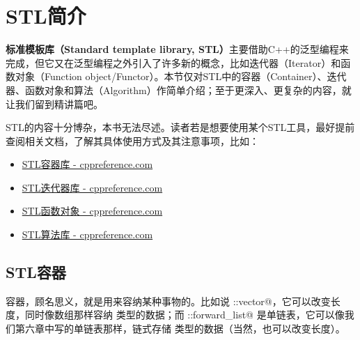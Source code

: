 \section{STL简介}
\textbf{标准模板库（Standard template library, STL）}主要借助C++的泛型编程来完成，但它又在泛型编程之外引入了许多新的概念，比如迭代器（Iterator）和函数对象（Function object/Functor）。本节仅对STL中的容器（Container）、迭代器、函数对象和算法（Algorithm）作简单介绍；至于更深入、更复杂的内容，就让我们留到精讲篇吧。\par
STL的内容十分博杂，本书无法尽述。读者若是想要使用某个STL工具，最好提前查阅相关文档，了解其具体使用方式及其注意事项，比如：
\begin{itemize}
    \item \href{https://zh.cppreference.com/w/cpp/container}{STL容器库 - cppreference.com}
    \item \href{https://zh.cppreference.com/w/cpp/iterator}{STL迭代器库 - cppreference.com}
    \item \href{https://zh.cppreference.com/w/cpp/utility/functional}{STL函数对象 - cppreference.com}
    \item \href{https://zh.cppreference.com/w/cpp/algorithm}{STL算法库 - cppreference.com}
\end{itemize}
\subsection*{STL容器}
容器，顾名思义，就是用来容纳某种事物的。比如说 \lstinline@std::vector@，它可以改变长度，同时像数组那样容纳 \lstinline@T@ 类型的数据；而 \lstinline@std::forward_list@ 是单链表，它可以像我们第六章中写的单链表那样，链式存储 \lstinline@T@ 类型的数据（当然，也可以改变长度）。\par
